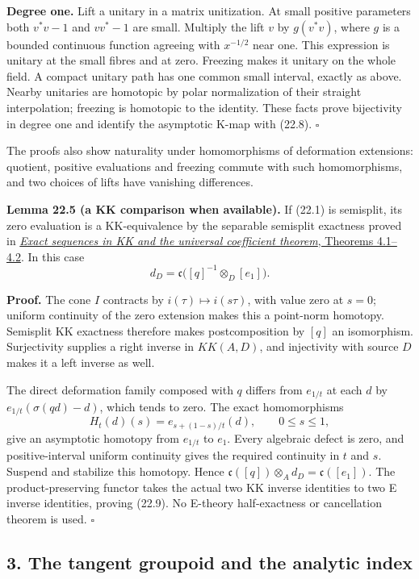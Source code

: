 \documentclass[
  11pt,
]{article}
\begin{document}
\textbf{Degree one.} Lift a unitary in a matrix unitization. At small
positive parameters both \(v^*v-1\) and \(vv^*-1\) are small. Multiply
the lift \(v\) by \(g(v^*v)\), where \(g\) is a bounded continuous
function agreeing with \(x^{-1/2}\) near one. This expression is unitary
at the small fibres and at zero. Freezing makes it unitary on the whole
field. A compact unitary path has one common small interval, exactly as
above. Nearby unitaries are homotopic by polar normalization of their
straight interpolation; freezing is homotopic to the identity. These
facts prove bijectivity in degree one and identify the asymptotic K-map
with (22.8). \(\square\)

The proofs also show naturality under homomorphisms of deformation
extensions: quotient, positive evaluations and freezing commute with
such homomorphisms, and two choices of lifts have vanishing differences.

\textbf{Lemma 22.5 (a KK comparison when available).} If (22.1) is
semisplit, its zero evaluation is a KK-equivalence by the separable
semisplit exactness proved in
\href{KT-KK-14.html\#4-excision-and-the-six-term-sequences}{\emph{Exact
sequences in KK and the universal coefficient theorem}, Theorems
4.1--4.2}. In this case \[
d_D=\mathfrak c\bigl([q]^{-1}\otimes_D[e_1]\bigr).
\tag{22.9}
\]

\textbf{Proof.} The cone \(I\) contracts by \(i(\tau)\mapsto i(s\tau)\),
with value zero at \(s=0\); uniform continuity of the zero extension
makes this a point-norm homotopy. Semisplit KK exactness therefore makes
postcomposition by \([q]\) an isomorphism. Surjectivity supplies a right
inverse in \(KK(A,D)\), and injectivity with source \(D\) makes it a
left inverse as well.

The direct deformation family composed with \(q\) differs from
\(e_{1/t}\) at each \(d\) by \(e_{1/t}(\sigma(qd)-d)\), which tends to
zero. The exact homomorphisms \[
H_t(d)(s)=e_{s+(1-s)/t}(d),\qquad 0\leq s\leq1,
\tag{22.10}
\] give an asymptotic homotopy from \(e_{1/t}\) to \(e_1\). Every
algebraic defect is zero, and positive-interval uniform continuity gives
the required continuity in \(t\) and \(s\). Suspend and stabilize this
homotopy. Hence \(\mathfrak c([q])\otimes_A d_D=\mathfrak c([e_1])\).
The product-preserving functor takes the actual two KK inverse
identities to two E inverse identities, proving (22.9). No E-theory
half-exactness or cancellation theorem is used. \(\square\)

\subsection{3. The tangent groupoid and the analytic
index}\label{the-tangent-groupoid-and-the-analytic-index}
\end{document}
